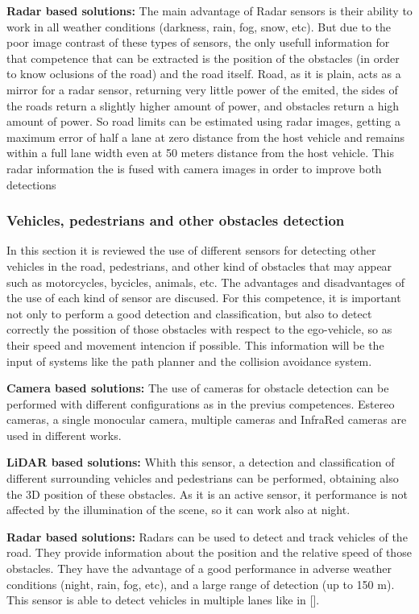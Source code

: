 \textbf{Radar based solutions:}
The main advantage of Radar sensors is their ability to work in all weather conditions (darkness, rain, fog, snow, etc). But due to the poor image contrast of these types of sensors, the only usefull information for that competence that can be extracted is the position of the obstacles (in order to know oclusions of the road) and the road itself. Road, as it is plain, acts as a mirror for a radar sensor, returning very little power of the emited, the sides of the roads return a slightly higher amount of power, and obstacles return a high amount of power. So road limits can be estimated using radar images, getting a maximum error of half a lane at zero distance from the host vehicle and remains within a full lane width even at 50 meters distance from the host vehicle. This radar information the is fused with camera images in order to improve both detections \cite{kaliyaperumal2001algorithm, ma2000simultaneous, Janda2013}

\subsubsection{Vehicles, pedestrians and other obstacles detection}
In this section it is reviewed the use of different sensors for detecting other vehicles in the road, pedestrians, and other kind of obstacles that may appear such as motorcycles, bycicles, animals, etc. The advantages and disadvantages of the use of each kind of sensor are discused. For this competence, it is important not only to perform a good detection and classification, but also to detect correctly the possition of those obstacles with respect to the ego-vehicle, so as their speed  and movement intencion if possible. This information will be the input of systems like the path planner and the collision avoidance system.


\textbf{Camera based solutions:}
The use of cameras for obstacle detection can be performed with different configurations as in the previus competences. Estereo cameras, a single monocular camera, multiple cameras and InfraRed cameras are used in different works.

\textbf{LiDAR based solutions:}
Whith this sensor, a detection and classification of different surrounding vehicles and pedestrians can be performed, obtaining also the 3D position of these obstacles. As it is an active sensor, it performance is not affected by the illumination of the scene, so it can work also at night. 

\textbf{Radar based solutions:}
Radars can be used to detect and track vehicles of the road. They provide information about the position and the relative speed of those obstacles. They have the advantage of a good performance in adverse weather conditions (night, rain, fog, etc), and a large range of detection (up to 150 m). This sensor is able to detect vehicles in multiple lanes like in [].

